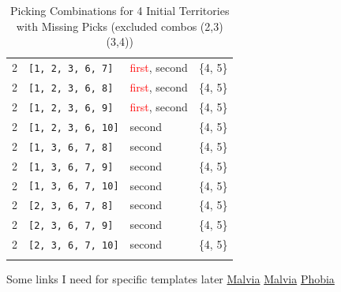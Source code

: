 \begin{longtable}{|p{2.5cm}|p{3cm}|p{2.5cm}|c|}
\rowcolor{Light_Blue}
2 & \texttt{[1, 2, 3, 6, 7]} & \textcolor{red}{first}, \textcolor{CustomBlue}{second} & \{4, 5\} \\ 
2 & \texttt{[1, 2, 3, 6, 8]} & \textcolor{red}{first}, \textcolor{CustomBlue}{second} & \{4, 5\} \\ 
2 & \texttt{[1, 2, 3, 6, 9]} & \textcolor{red}{first}, \textcolor{CustomBlue}{second} & \{4, 5\} \\ 
2 & \texttt{[1, 2, 3, 6, 10]} & \textcolor{CustomBlue}{second} & \{4, 5\} \\ 
2 & \texttt{[1, 3, 6, 7, 8]} & \textcolor{CustomBlue}{second} & \{4, 5\} \\ 
2 & \texttt{[1, 3, 6, 7, 9]} & \textcolor{CustomBlue}{second} & \{4, 5\} \\ 
2 & \texttt{[1, 3, 6, 7, 10]} & \textcolor{CustomBlue}{second} & \{4, 5\} \\ 
2 & \texttt{[2, 3, 6, 7, 8]} & \textcolor{CustomBlue}{second} & \{4, 5\} \\ 
2 & \texttt{[2, 3, 6, 7, 9]} & \textcolor{CustomBlue}{second} & \{4, 5\} \\ 
2 & \texttt{[2, 3, 6, 7, 10]} & \textcolor{CustomBlue}{second} & \{4, 5\} \\ \hline \hline

\caption{Picking Combinations for 4 Initial Territories with Missing Picks (excluded combos (2,3)(3,4))}
\label{tab:5territories_consecutive}
\end{longtable}
\normalsize





Some links I need for specific templates later
\href{https://www.warzone.com/MultiPlayer?GameID=26520726}{Malvia}
\href{https://www.warzone.com/MultiPlayer?GameID=27346932}{Malvia}
\href{https://www.warzone.com/MultiPlayer?GameID=40193312 }{Phobia}

